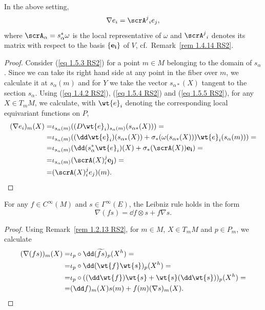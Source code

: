 \begin{prop}[{{\cite[Prop.~1.5.3]{RS2}}}]\label{prop 1.5.3 RS2}
    In the above setting,
    \[\nabla e_i=\scrA^j{}_i e_j,\label{eq 1.5.6 RS2}\]
    where $\scrA_\alpha=s_\alpha^\ast\omega$ is the local representative of $\omega$ and $\scrA^j{}_i$ denotes its matrix with respect to the basis $\{\bf{e}_i\}$ of $V$, cf.\ Remark~\ref{rem 1.4.14 RS2}.
\end{prop}
\begin{proof}
    Consider (\ref{eq 1.5.3 RS2}) for a point $m\in M$ belonging to the domain of $s_\alpha$. Since we can take its right hand side at any point in the fiber over $m$, we calculate it at $s_\alpha(m)$ and for $Y$ we take the vector $s_{\alpha\ast}(X)$ tangent to the section $s_\alpha$. Using (\ref{eq 1.4.2 RS2}), (\ref{eq 1.5.4 RS2}) and (\ref{eq 1.5.5 RS2}), for any $X\in T_mM$, we calculate, with $\wt{e}_i$ denoting the corresponding local equivariant functions on $P$,
    \begin{align}
        (\nabla e_i)_m(X)=&\iota_{s_\alpha(m)}((D\wt{e}_i)_{s_\alpha(m)}(s_{\alpha\ast}(X)))=\\
        =&\iota_{s_\alpha(m)}((\dd\wt{e}_i)(s_{\alpha\ast}(X))+\sigma_\ast(\omega(s_{\alpha\ast}(X)))\wt{e}_i(s_\alpha(m)))=\\
        =&\iota_{s_\alpha(m)}(\dd(s_\alpha^\ast\wt{e}_i)(X)+\sigma_\ast(\scrA(X))\bf{e}_i)=\\
        =&\iota_{s_\alpha(m)}(\scrA(X)^j_i\bf{e}_j)=\\
        =&(\scrA(X)^j_i e_j)(m).
    \end{align}
\end{proof}

\begin{prop}[{{\cite[Prop.~1.5.4]{RS2}}}]\label{prop 1.5.4 RS2}
    For any $f\in C^\infty(M)$ and $s\in\Gamma^\infty(E)$, the Leibniz rule holds in the form
    \[\nabla(f s)=\dd f\otimes s+f\nabla s.\label{eq 1.5.7 RS2}\]
\end{prop}
\begin{proof}
    Using Remark~\ref{rem 1.2.13 RS2}, for $m\in M$, $X\in T_mM$ and $p\in P_m$, we calculate
    \begin{align}
        (\nabla(fs))_m(X)=&\iota_p\circ \dd(\widetilde{fs})_p (X^h)=\\
        =&\iota_p\circ \dd(\wt{f}\wt{s})_p(X^h)=\\
        =&\iota_p\circ ((\dd\wt{f})\wt{s}+\wt{s}(\dd\wt{s}))_p(X^h)=\\
        =&(\dd f)_m(X)s(m)+f(m)(\nabla s)_m(X).
    \end{align}
\end{proof}

